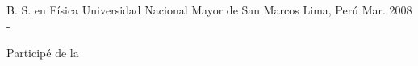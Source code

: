 

\begin{cventries}

  \cventry
    {B. S. en Física} %
    {Universidad Nacional Mayor de San Marcos} %
    {Lima, Perú} %
    {
      Mar. 2008 - \present
    } %
    {
      \begin{cvitems} %
        \item {Participé de la }
      \end{cvitems}
    }
\end{cventries}
